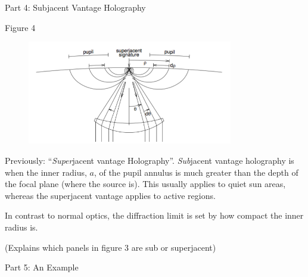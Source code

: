 \documentclass{beamer}
\begin{document}
\begin{frame}{Part 4: Subjacent Vantage Holography}
\end{frame}

\begin{frame}{Figure 4}
    \begin{figure}
        \includegraphics[width=0.8\textwidth]{fig_4.png}
    \end{figure}
\end{frame}

\begin{frame}{4.1}
    Previously: ``\emph{Super}jacent vantage Holography''.
    \emph{Sub}jacent vantage holography is when the inner radius, $a$,
    of the pupil annulus is much greater than the depth of the focal plane
    (where the source is). This usually applies to quiet sun areas, whereas
    the superjacent vantage applies to active regions.
\end{frame}

\begin{frame}{4.2}
    In contrast to normal optics, the diffraction limit is set by how
    compact the inner radius is.
\end{frame}

\begin{frame}{4.3}
    (Explains which panels in figure 3 are sub or superjacent)
\end{frame}

\begin{frame}{Part 5: An Example}
\end{frame}

\begin{frame}{5.1}
\end{frame}
\end{document}

